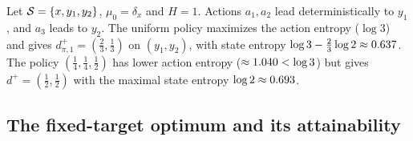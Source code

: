\begin{example}\label{ex:fpg-entropy}
Let $\cS=\{x,y_1,y_2\}$, $\mu_0=\delta_x$ and $H=1$. Actions $a_1,a_2$ lead deterministically to $y_1$, and $a_3$ leads to $y_2$.
The uniform policy maximizes the action entropy ($\log3$) and gives $d^+_{\pi,1}=(\frac23,\frac13)$ on $(y_1,y_2)$, with state entropy $\log3-\frac23\log2\approx\vn{const.ent.state}{0.637}$.
The policy $(\frac14,\frac14,\frac12)$ has lower action entropy ($\approx\vn{const.ent.action}{1.040}<\log3$) but gives $d^+=(\frac12,\frac12)$ with the maximal state entropy $\log2\approx\vn{const.log2}{0.693}$.
\end{example}

\subsection{The fixed-target optimum and its attainability}\label{sec:fpg-opt}

